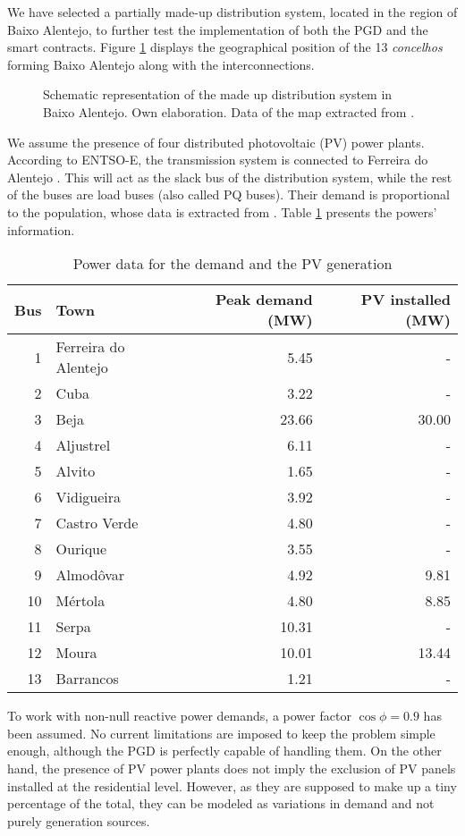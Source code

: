 We have selected a partially made-up distribution system, located in the region of Baixo Alentejo, to further test the implementation of both the PGD and the smart contracts. Figure \ref{fig:baixo1} displays the geographical position of the 13 \textit{concelhos} forming Baixo Alentejo along with the interconnections.

\begin{figure}[!htb]\centering
    \caption{Schematic representation of the made up distribution system in Baixo Alentejo. Own elaboration. Data of the map extracted from \cite{cimbal}.}
    \label{fig:baixo1}
\end{figure}
We assume the presence of four distributed photovoltaic (PV) power plants. According to ENTSO-E, the transmission system is connected to Ferreira do Alentejo \cite{entsoe}. This will act as the slack bus of the distribution system, while the rest of the buses are load buses (also called PQ buses). Their demand is proportional to the population, whose data is extracted from \cite{wiki1}. Table \ref{tab:Sdata} presents the powers' information.

\begin{table}[!htb]\centering
    \caption{Power data for the demand and the PV generation}
    \begin{tabular}{rlrr}
        \hline
         \textbf{Bus} & \textbf{Town} & \textbf{Peak demand (MW)} & \textbf{PV installed (MW)} \\
         \hline
         1 & Ferreira do Alentejo & 5.45 & - \\
         2 & Cuba & 3.22 & - \\
         3 & Beja & 23.66 & 30.00 \\
         4 & Aljustrel & 6.11 & - \\
         5 & Alvito & 1.65 & - \\
         6 & Vidigueira & 3.92 & - \\
         7 & Castro Verde & 4.80 & - \\
         8 & Ourique & 3.55 & - \\
         9 & Almodôvar & 4.92 & 9.81 \\
         10 & Mértola & 4.80 & 8.85 \\
         11 & Serpa & 10.31 & - \\
         12 & Moura & 10.01 & 13.44 \\
         13 & Barrancos & 1.21 & - \\
        \hline
    \end{tabular}
    \label{tab:Sdata}
\end{table}
To work with non-null reactive power demands, a power factor $\cos \phi = 0.9$ has been assumed. No current limitations are imposed to keep the problem simple enough, although the PGD is perfectly capable of handling them. On the other hand, the presence of PV power plants does not imply the exclusion of PV panels installed at the residential level. However, as they are supposed to make up a tiny percentage of the total, they can be modeled as variations in demand and not purely generation sources. 


